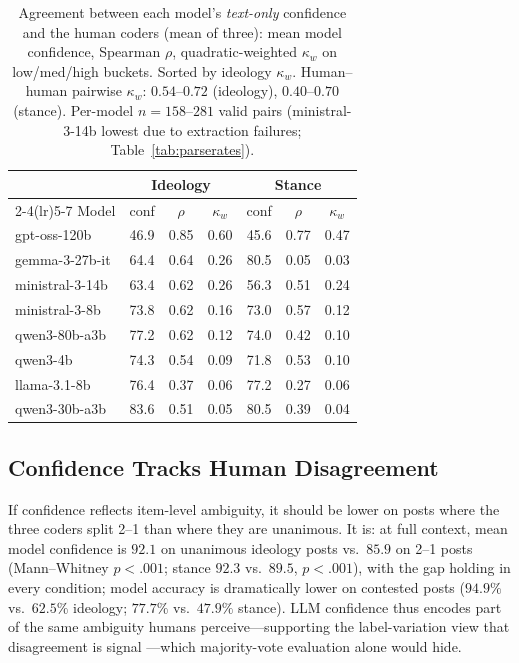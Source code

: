 \documentclass[11pt]{article}
\begin{document}
\begin{table}[t]
\centering
\small
\setlength{\tabcolsep}{4pt}
\begin{tabular}{lcccccc}
\toprule
 & \multicolumn{3}{c}{Ideology} & \multicolumn{3}{c}{Stance} \\
\cmidrule(lr){2-4}\cmidrule(lr){5-7}
Model & conf & $\rho$ & $\kappa_w$ & conf & $\rho$ & $\kappa_w$ \\
\midrule
gpt-oss-120b    & 46.9 & 0.85 & 0.60 & 45.6 & 0.77 & 0.47 \\
gemma-3-27b-it  & 64.4 & 0.64 & 0.26 & 80.5 & 0.05 & 0.03 \\
ministral-3-14b & 63.4 & 0.62 & 0.26 & 56.3 & 0.51 & 0.24 \\
ministral-3-8b  & 73.8 & 0.62 & 0.16 & 73.0 & 0.57 & 0.12 \\
qwen3-80b-a3b   & 77.2 & 0.62 & 0.12 & 74.0 & 0.42 & 0.10 \\
qwen3-4b        & 74.3 & 0.54 & 0.09 & 71.8 & 0.53 & 0.10 \\
llama-3.1-8b    & 76.4 & 0.37 & 0.06 & 77.2 & 0.27 & 0.06 \\
qwen3-30b-a3b   & 83.6 & 0.51 & 0.05 & 80.5 & 0.39 & 0.04 \\
\bottomrule
\end{tabular}
\caption{Agreement between each model's \emph{text-only} confidence and the human coders (mean of three): mean model confidence, Spearman $\rho$, quadratic-weighted $\kappa_w$ on low/med/high buckets. Sorted by ideology $\kappa_w$. Human--human pairwise $\kappa_w$: $0.54$--$0.72$ (ideology), $0.40$--$0.70$ (stance). Per-model $n{=}158$--$281$ valid pairs (ministral-3-14b lowest due to extraction failures; Table~\ref{tab:parserates}).}
\label{tab:conf_agree}
\end{table}

\subsection{Confidence Tracks Human Disagreement}
\label{sec:results_unanimity}

If confidence reflects item-level ambiguity, it should be lower on posts where the three coders split 2--1 than where they are unanimous. It is: at full context, mean model confidence is $92.1$ on unanimous ideology posts vs.\ $85.9$ on 2--1 posts (Mann--Whitney $p{<}.001$; stance $92.3$ vs.\ $89.5$, $p{<}.001$), with the gap holding in every condition; model accuracy is dramatically lower on contested posts ($94.9\%$ vs.\ $62.5\%$ ideology; $77.7\%$ vs.\ $47.9\%$ stance). LLM confidence thus encodes part of the same ambiguity humans perceive---supporting the label-variation view that disagreement is signal \cite{plank_problem_2022}---which majority-vote evaluation alone would hide.
\end{document}
